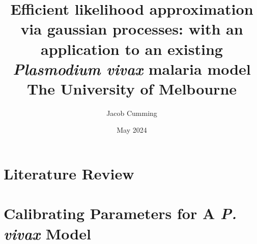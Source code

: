 \documentclass{book}
\begin{document}

\title{
{Efficient likelihood approximation via gaussian processes: 
with an application to an existing \emph{Plasmodium vivax} malaria model}\\
{\large The University of Melbourne}
}
\author{Jacob Cumming}


\date{May 2024}

\maketitle
{}
\tableofcontents

\listoffigures

% 
% 


\newpage

% 
\part{Literature Review}


% 
% 


\part{Calibrating Parameters for A \emph{P. vivax} Model}
% 

% 
% 

\printbibliography
\end{document}

